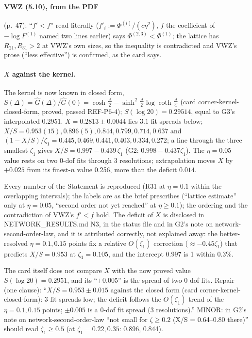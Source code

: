 \documentclass[11pt]{article}
\begin{document}
\paragraph{VWZ (5.10), from the PDF} (p.~47):
``$f'<f$'' read literally ($f'_i:=\Phi^{(i)}/(c\eta^2)$, $f$ the coefficient of $-\log F^{(1)}$ named two lines
earlier) says $\Phi^{(2,3)}<\Phi^{(1)}$; the lattice has $R_{21},R_{31}>2$ at VWZ's own sizes, so the inequality is
contradicted and VWZ's prose (``less effective'') is confirmed, as the card says.

\paragraph{$X$ against the kernel.} The kernel is now known in closed form, $S(\Delta)=\hat G(\Delta)/\hat G(0)=
\cosh\frac\Delta2-\sinh^2\frac\Delta2\log\coth\frac\Delta4$ (card corner-kernel-closed-form, proved, passed
REF-P6-4); $S(\log20)=0.29514$, equal to G3's interpolated 0.2951. $X=0.2813\pm0.0044$ lies $3.1$ fit spreads
below; $X/S=0.953(15),0.896(5),0.844,0.799,0.714,0.637$ and $(1-X/S)/\zeta_1=0.445,0.469,0.441,0.403,0.334,0.272$;
a line through the three smallest $\zeta_1$ gives $X/S=0.997-0.439\,\zeta_1$ (G2: $0.998-0.437\zeta_1$). The
$\eta=0.05$ value rests on two 0-dof fits through 3 resolutions; extrapolation moves $X$ by $+0.025$ from its
finest-$n$ value 0.256, more than the deficit $0.014$.
\begin{verdictok}
Every number of the Statement is reproduced (R31 at $\eta=0.1$ within the overlapping intervals); the labels are
as the brief prescribes (``lattice estimate'' only at $\eta=0.05$, ``second order not yet reached'' at
$\eta\ge0.1$); the ordering and the contradiction of VWZ's $f'<f$ hold. The deficit of $X$ is disclosed in
NETWORK\_RESULTS.md N3, in the status file and in G2's note on network-second-order-law, and it is attributed
correctly, not explained away: the better-resolved $\eta=0.1,0.15$ points fix a relative $O(\zeta_1)$ correction
($\approx-0.45\zeta_1$) that predicts $X/S=0.953$ at $\zeta_1=0.105$, and the intercept $0.997$ is 1 within 0.3\%.
\end{verdictok}
\begin{verdictgap}
The card itself does not compare $X$ with the now proved value $S(\log20)=0.2951$, and its ``$\pm0.005$'' is the
spread of two 0-dof fits. Repair (one clause): ``$X/S=0.953\pm0.015$ against the closed form (card
corner-kernel-closed-form): 3 fit spreads low; the deficit follows the $O(\zeta_1)$ trend of the $\eta=0.1,0.15$
points; $\pm0.005$ is a 0-dof fit spread (3 resolutions).'' MINOR: in G2's note on network-second-order-law
``not small for $\zeta\ge0.2$ (X/S = 0.64--0.80 there)'' should read $\zeta_1\ge0.5$ (at $\zeta_1=0.22,0.35$:
0.896, 0.844).
\end{verdictgap}
\end{document}
